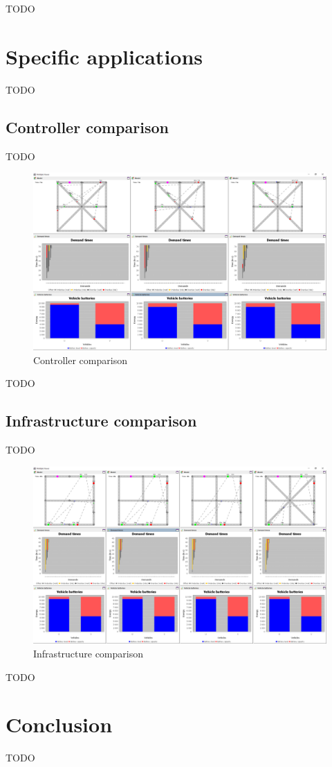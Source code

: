\documentclass[10pt,twocolumn]{article}
\begin{document}
TODO

\section{Specific applications}
\label{sec:application}

TODO

\subsection{Controller comparison}
\label{sec:controller-comparison}

TODO

\begin{figure}[tbp]
    \includegraphics[width=\textwidth]{../../screenshots/controller-comparison.png}
    \caption{Controller comparison}
    \label{fig:controller-comparison}
\end{figure}

TODO

\subsection{Infrastructure comparison}
\label{sec:infrastructure-comparison}

TODO

\begin{figure}[tbp]
    \includegraphics[width=\textwidth]{../../screenshots/infrastructure-comparison.png}
    \caption{Infrastructure comparison}
    \label{fig:infratructure-comparison}
\end{figure}

TODO

\section{Conclusion}
\label{sec:conclusion}

TODO



\end{document}
